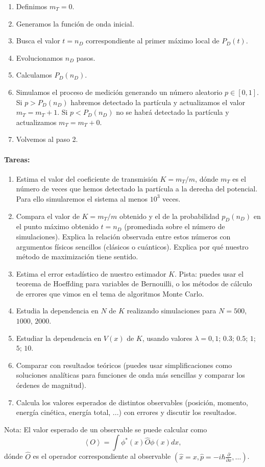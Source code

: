 \documentclass[12pt,spanish]{iopart}
\begin{document}
\begin{enumerate}
\item Definimos $m_T=0$.
\item Generamos la funci\'on de onda inicial.
\item Busca el valor $t=n_D$ correspondiente al primer máximo local de $P_D(t)$.
\item Evolucionamos $n_D$ pasos.
\item Calculamos $P_D(n_D)$.
\item Simulamos el proceso de medición generando un número aleatorio $p\in [0,1]$. Si $p>P_D(n_D)$ habremos detectado la partícula y actualizamos el valor $m_T=m_T+1$. Si $p<P_D(n_D)$ no se habrá detectado la partícula y actualizamos $m_T=m_T+0$.
\item Volvemos al paso 2.
\end{enumerate}


\paragraph{\bf Tareas:}
\begin{enumerate}
\item Estima el valor del coeficiente de transmisión $K=m_T/m$, dónde $m_T$ es el n\'umero de veces que hemos detectado la part\'icula a la derecha del potencial. Para ello simularemos el sistema al menos $10^3$ veces.
\item  Compara el valor de $K=m_T/m$ obtenido y el de la probabilidad $p_D(n_D)$ en el punto máximo obtenido $t=n_D$ (promediada sobre el número de simulaciones). Explica la relación observada entre estos números con argumentos físicos sencillos (clásicos o cuánticos). Explica por qué nuestro método de maximización tiene sentido.
\item Estima el error estadístico de nuestro estimador $K$. Pista: puedes usar el teorema de Hoeffding para variables de Bernouilli, o los métodos de cálculo de errores que vimos en el tema de algoritmos Monte Carlo.
\item Estudia la dependencia en $N$ de $K$ realizando simulaciones para $N=500$, $1000$, $2000$.
\item Estudiar la dependencia en $V(x)$ de $K$, usando valores $\lambda=0, 1$; $0.3$; $0.5$; $1$; $5$; $10$.
\item Comparar con resultados te\'oricos (puedes usar simplificaciones como soluciones analíticas para funciones de onda más sencillas y comparar los órdenes de magnitud). 
\item Calcula los valores esperados de distintos observables (posici\'on, momento, energ\'ia cin\'etica, energ\'ia total, ...) con errores y discutir los resultados.
\end{enumerate}
Nota: El valor esperado de un observable se puede calcular como 
$$\left< O \right >=\int  \phi^*(x) \hat{O}\phi(x) dx, $$ 
dónde $\hat{O}$ es el operador correspondiente al observable $\left( \hat{x}=x, \hat{p}= -i\hbar \frac{\partial}{\partial x} , \dots  \right)$.  
\end{document}
